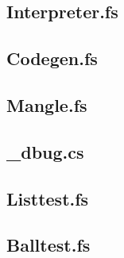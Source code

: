 \documentclass[10pt,a4paper]{article}
\begin{document}
\subsection{Interpreter.fs} 

\subsection{Codegen.fs} 

\subsection{Mangle.fs} 

\subsection{\_dbug.cs}

\subsection{Listtest.fs} 

\subsection{Balltest.fs} 

\end{document}

